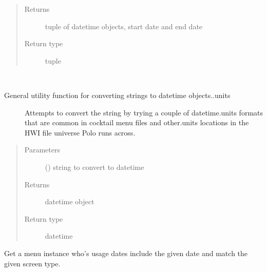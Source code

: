 \documentclass[letterpaper,10pt,english]{sphinxmanual}
\begin{document}
\begin{fulllineitems}
\begin{fulllineitems}
\begin{quote}
\begin{description}
\item[{Returns}] \leavevmode
tuple of datetime objects, start date and end date

\item[{Return type}] \leavevmode
tuple

\end{description}\end{quote}

\end{fulllineitems}


\begin{fulllineitems}
\label{\detokenize{polo.utils:polo.utils.io_utils.BarTender.datetime_converter}}~\begin{description}
\item[{General utility function for converting strings to datetime objects..units}] \leavevmode
Attempts to convert the string by trying a couple of datetime.units
formats that are common in cocktail menu files and other.units
locations in the HWI file universe Polo runs across.

\end{description}
\begin{quote}\begin{description}
\item[{Parameters}] \leavevmode
{} () \textendash{} string to convert to datetime

\item[{Returns}] \leavevmode
datetime object

\item[{Return type}] \leavevmode
datetime

\end{description}\end{quote}

\end{fulllineitems}


\begin{fulllineitems}
\label{\detokenize{polo.utils:polo.utils.io_utils.BarTender.get_menu_by_date}}
Get a menu instance who’s usage dates include the given date and
match the given screen type.


\end{fulllineitems}
\end{fulllineitems}
\end{document}
